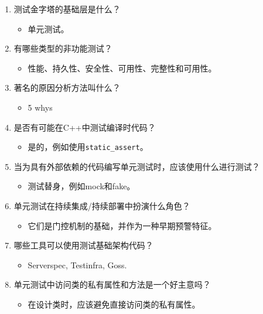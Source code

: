 \begin{enumerate}
\item
测试金字塔的基础层是什么？
\begin{itemize}
\item 
单元测试。
\end{itemize}

\item
有哪些类型的非功能测试？
\begin{itemize}
\item 
性能、持久性、安全性、可用性、完整性和可用性。
\end{itemize}

\item
著名的原因分析方法叫什么？
\begin{itemize}
\item 
5 whys
\end{itemize}

\item
是否有可能在C++中测试编译时代码？
\begin{itemize}
\item 
是的，例如使用\texttt{static\_assert}。
\end{itemize}

\item
当为具有外部依赖的代码编写单元测试时，应该使用什么进行测试？
\begin{itemize}
\item 
测试替身，例如mock和fake。
\end{itemize}

\item
单元测试在持续集成/持续部署中扮演什么角色？
\begin{itemize}
\item 
它们是门控机制的基础，并作为一种早期预警特征。
\end{itemize}

\item
哪些工具可以使用测试基础架构代码？
\begin{itemize}
\item 
Serverspec, Testinfra, Goss.
\end{itemize}

\item
单元测试中访问类的私有属性和方法是一个好主意吗？
\begin{itemize}
\item 
在设计类时，应该避免直接访问类的私有属性。
\end{itemize}
\end{enumerate}